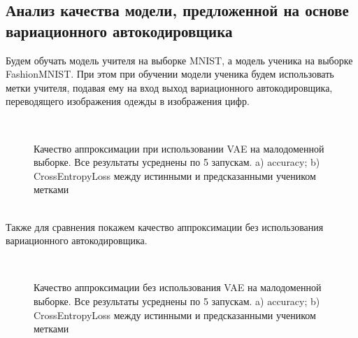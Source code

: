 \subsection{Анализ качества модели, предложенной на основе вариационного автокодировщика}
Будем обучать модель учителя на выборке MNIST, а модель ученика на выборке FashionMNIST. При этом при обучении модели ученика будем использовать метки учителя, подавая ему на вход выход вариационного автокодировщика, переводящего изображения одежды в изображения цифр.\\
\begin{figure}[h!t]\center
{}
\\
\caption{Качество аппроксимации при использовании VAE на малодоменной выборке. Все результаты усреднены по 5 запускам. a) accuracy; b) CrossEntropyLoss между истинными и предсказанными учеником метками}
\end{figure}\\
Также для сравнения покажем качество аппроксимации без использования вариационного автокодировщика.\\
\begin{figure}[h!t]\center
{}
\\
\caption{Качество аппроксимации без использования VAE на малодоменной выборке. Все результаты усреднены по 5 запускам. a) accuracy; b) CrossEntropyLoss между истинными и предсказанными учеником метками}
\end{figure}\\

